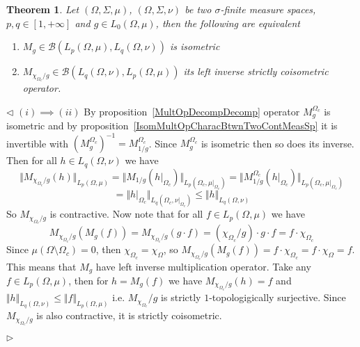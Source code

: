 \documentclass[12pt]{article}
\newtheorem{theorem}{Theorem}[subsection]
\newenvironment{proof}{\par $\triangleleft$}{$\triangleright$}
\begin{document}
\begin{theorem}\label{IsomMultOpDescBtwnTwoMeasSp}
    Let $(\Omega,\Sigma,\mu)$, $(\Omega,\Sigma,\nu)$ be two $\sigma$-finite
    measure spaces, $p,q\in[1,+\infty]$ and $g\in L_0(\Omega,\mu)$, then the
    following are equivalent
    \begin{enumerate}[label = (\roman*)]
        \item $M_g\in\mathcal{B}(L_p(\Omega,\mu),L_q(\Omega,\nu))$ is isometric

        \item $M_{\chi_{\Omega_c}/g}\in
                  \mathcal{B}(L_q(\Omega,\nu), L_p(\Omega,\mu))$ its left inverse
              strictly coisometric operator.
    \end{enumerate}
\end{theorem}
\begin{proof}
    $(i)\implies (ii)$ By proposition~\ref{MultOpDecompDecomp} operator
    $M_g^{\Omega_c}$ is isometric and by
    proposition~\ref{IsomMultOpCharacBtwnTwoContMeasSp} it is invertible with
    ${(M_g^{\Omega_c})}^{-1}=M_{1/g}^{\Omega_c}$. Since $M_g^{\Omega_c}$ is
    isometric then so does its inverse. Then for all $h\in L_q(\Omega,\nu)$
    we have
    $$
        \Vert M_{\chi_{\Omega_c}/g}(h)\Vert_{L_p(\Omega,\mu)}= \Vert
        M_{1/g}(h|_{\Omega_c})\Vert_{L_p(\Omega_c,\mu|_{\Omega_c})}= \Vert
        M_{1/g}^{\Omega_c}(h|_{\Omega_c})\Vert_{L_p(\Omega_c,\mu|_{\Omega_c})}
    $$
    $$
        =\Vert h|_{\Omega_c}\Vert_{L_q(\Omega_c,\nu|_{\Omega_c})} \leq \Vert h
        \Vert_{L_q(\Omega,\nu)}
    $$
    So $M_{\chi_{\Omega_c}/g}$ is contractive. Now note that for
    all $f\in L_p(\Omega,\mu)$ we have
    $$
        M_{\chi_{\Omega_c}/g}(M_g(f)) =M_{\chi_{\Omega_c}/g}(g\cdot f)
        =(\chi_{\Omega_c}/g)\cdot g\cdot f =f\cdot\chi_{\Omega_c}
    $$
    Since $\mu(\Omega\setminus\Omega_c)=0$, then
    $\chi_{\Omega_c}=\chi_{\Omega}$, so
    $M_{\chi_{\Omega_c}/g}(M_g(f))=f\cdot\chi_{\Omega_c}=f\cdot\chi_{\Omega}=f$.
    This means that $M_g$ have left inverse multiplication operator. Take any
    $f\in L_p(\Omega,\mu)$, then for $h=M_g(f)$ we have
    $M_{\chi_{\Omega_c}/g}(h)=f$ and
    $\Vert h\Vert_{L_q(\Omega,\nu)}\leq\Vert f\Vert_{L_p(\Omega,\mu)}$ i.e.
    $M_{\chi_{\Omega_c}}/g$ is strictly $1$-topologigically surjective. Since
    $M_{\chi_{\Omega_c}/g}$ is also contractive, it is strictly coisometric.


\end{proof}
\end{document}
